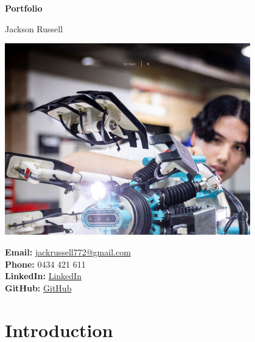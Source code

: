 \documentclass{article}
\begin{document}
\begin{titlepage}
    \centering
    \vspace*{2cm}
    {\Huge\bfseries Portfolio \par}
    \vspace{2cm}
    {\Large Jackson Russell \par}
    \vspace{1cm}

    \includegraphics[width=0.80\textwidth,clip,keepaspectratio]{images/other/prof.png}
    \vspace{0.7cm}

    \textbf{Email:} \href{mailto:jackrussell772@gmail.com}{jackrussell772@gmail.com} \\
    \textbf{Phone:} 0434 421 611 \\
    \textbf{LinkedIn:} \href{https://www.linkedin.com/in/jackson-russell-7aa157205/}{LinkedIn} \\ 
    \textbf{GitHub:} \href{https://github.com/jackfruittt}{GitHub} \\


    \vfill

\end{titlepage}

\tableofcontents
\newpage


\section*{Introduction}





\end{document}
